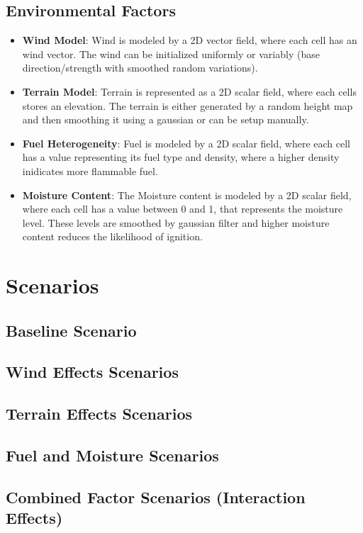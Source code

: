 \subsection{Environmental Factors}
\begin{itemize}
	\item \textbf{Wind Model}: Wind is modeled by a 2D vector field, where each cell has an wind vector. The wind can be initialized uniformly or variably (base direction/strength with smoothed random variations).
	\item \textbf{Terrain Model}: Terrain is represented as a 2D scalar field, where each cells stores an elevation. The terrain is either generated by a random height map and then smoothing it using a gaussian or can be setup manually.
	\item \textbf{Fuel Heterogeneity}: Fuel is modeled by a 2D scalar field, where each cell has a value representing its fuel type and density, where a higher density inidicates more flammable fuel.
	\item \textbf{Moisture Content}: The Moisture content is modeled by a 2D scalar field, where each cell has a value between 0 and 1, that represents the moisture level. These levels are smoothed by gaussian filter and higher moisture content reduces the likelihood of ignition.
\end{itemize}

\section{Scenarios}

\subsection{Baseline Scenario}
\subsection{Wind Effects Scenarios}
\subsection{Terrain Effects Scenarios}
\subsection{Fuel and Moisture Scenarios}
\subsection{Combined Factor Scenarios (Interaction Effects)}
